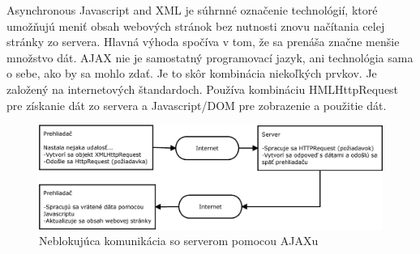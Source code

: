 Asynchronous Javascript and XML je súhrnné označenie technológií, ktoré umožňujú meniť obsah webových stránok bez nutnosti znovu načítania celej stránky zo servera. Hlavná výhoda spočíva v tom, že sa prenáša značne menšie množstvo dát. AJAX nie je samostatný programovací jazyk, ani technológia sama o sebe, ako by sa mohlo zdať. Je to skôr kombinácia niekoľkých prvkov. Je založený na internetových štandardoch. Používa kombináciu HMLHttpRequest pre získanie dát zo servera a Javascript/DOM pre zobrazenie a použitie dát. \cite{w3-ajax}
\begin{figure}[h]
  \centering
  \includegraphics[scale=0.40]{fig/ajax.eps}
  \caption{Neblokujúca komunikácia so serverom pomocou AJAXu}
  \label{fig:ajax}
\end{figure}

